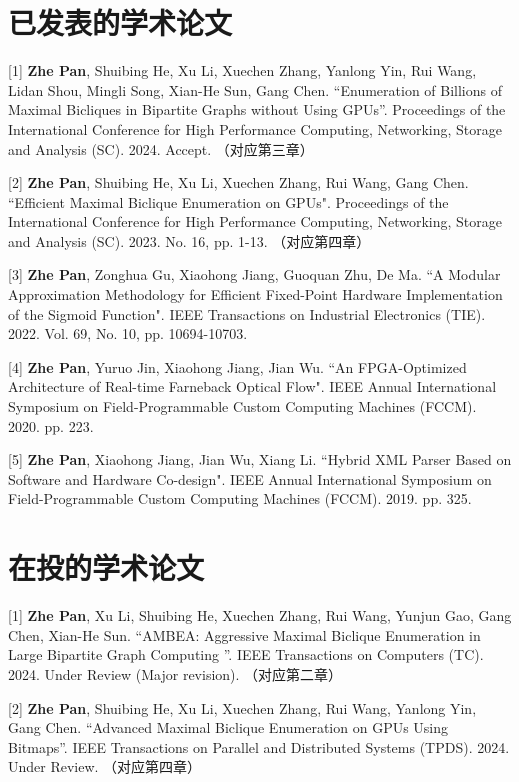 \cleardoublepage
{}

\section*{已发表的学术论文}

[1] \textbf{Zhe Pan}, Shuibing He, Xu Li, Xuechen Zhang, Yanlong Yin, Rui Wang, Lidan Shou, Mingli Song, Xian-He Sun, Gang Chen. ``Enumeration of Billions of Maximal Bicliques in Bipartite Graphs without Using GPUs''. Proceedings of the International Conference for High Performance Computing, Networking, Storage and Analysis (SC). 2024. Accept. （对应第三章）

[2] \textbf{Zhe Pan}, Shuibing He, Xu Li, Xuechen Zhang, Rui Wang, Gang Chen. ``Efficient Maximal Biclique Enumeration on GPUs". Proceedings of the International Conference for High Performance Computing, Networking, Storage and Analysis (SC). 2023. No. 16, pp. 1-13. （对应第四章）

[3] \textbf{Zhe Pan}, Zonghua Gu, Xiaohong Jiang, Guoquan Zhu, De Ma. ``A Modular Approximation Methodology for Efficient Fixed-Point Hardware Implementation of the Sigmoid Function". IEEE Transactions on Industrial Electronics (TIE). 2022. Vol. 69, No. 10, pp. 10694-10703.

\begin{sloppypar}
[4] \textbf{Zhe Pan}, Yuruo Jin, Xiaohong Jiang, Jian Wu. ``An FPGA-Optimized Architecture of Real-time Farneback Optical Flow". IEEE Annual International Symposium on Field-Programmable Custom Computing Machines (FCCM). 2020. pp. 223.
\end{sloppypar}


[5] \textbf{Zhe Pan}, Xiaohong Jiang, Jian Wu, Xiang Li. ``Hybrid XML Parser Based on Software and Hardware
Co-design". IEEE Annual International Symposium on Field-Programmable Custom Computing Machines (FCCM). 2019. pp. 325.

\section*{在投的学术论文}

[1] \textbf{Zhe Pan}, Xu Li, Shuibing He, Xuechen Zhang, Rui Wang, Yunjun Gao, Gang Chen, Xian-He Sun. ``AMBEA: Aggressive Maximal Biclique Enumeration in Large Bipartite Graph Computing ''. IEEE Transactions on Computers (TC). 2024. Under Review (Major revision). （对应第二章）

[2] \textbf{Zhe Pan}, Shuibing He, Xu Li, Xuechen Zhang, Rui Wang, Yanlong Yin, Gang Chen. ``Advanced Maximal Biclique Enumeration on GPUs Using Bitmaps''. IEEE Transactions on Parallel and Distributed Systems (TPDS). 2024. Under Review. （对应第四章）

